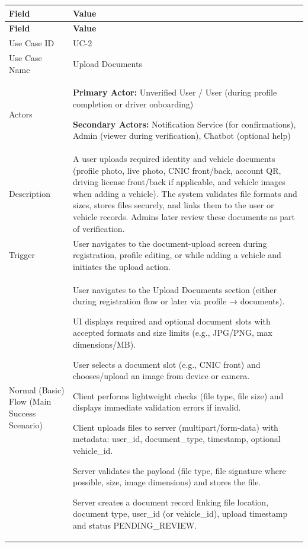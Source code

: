 \begin{longtable}{|p{3.5cm}|p{12cm}|}
\hline
\rowcolor{lightgray!30}
\textbf{Field} & \textbf{Value} \\
\hline
\endfirsthead
\hline
\rowcolor{lightgray!30}
\textbf{Field} & \textbf{Value} \\
\hline
\endhead
\hline
\endfoot
Use Case ID & UC-2 \\
\hline
Use Case Name & Upload Documents \\
\hline
Actors & 
\textbf{Primary Actor:} Unverified User / User (during profile completion or driver onboarding)

\textbf{Secondary Actors:} Notification Service (for confirmations), Admin (viewer during verification), Chatbot (optional help) \\
\hline
Description & 
A user uploads required identity and vehicle documents (profile photo, live photo, CNIC front/back, account QR, driving license front/back if applicable, and vehicle images when adding a vehicle). The system validates file formats and sizes, stores files securely, and links them to the user or vehicle records. Admins later review these documents as part of verification. \\
\hline
Trigger & 
User navigates to the document-upload screen during registration, profile editing, or while adding a vehicle and initiates the upload action. \\
\hline
Normal (Basic) Flow (Main Success Scenario) &
User navigates to the Upload Documents section (either during registration flow or later via profile → documents).

UI displays required and optional document slots with accepted formats and size limits (e.g., JPG/PNG, max dimensions/MB).

User selects a document slot (e.g., CNIC front) and chooses/upload an image from device or camera.

Client performs lightweight checks (file type, file size) and displays immediate validation errors if invalid.

Client uploads files to server (multipart/form-data) with metadata: user\_id, document\_type, timestamp, optional vehicle\_id.

Server validates the payload (file type, file signature where possible, size, image dimensions) and stores the file.

Server creates a document record linking file location, document type, user\_id (or vehicle\_id), upload timestamp and status PENDING\_REVIEW.


\end{longtable}
